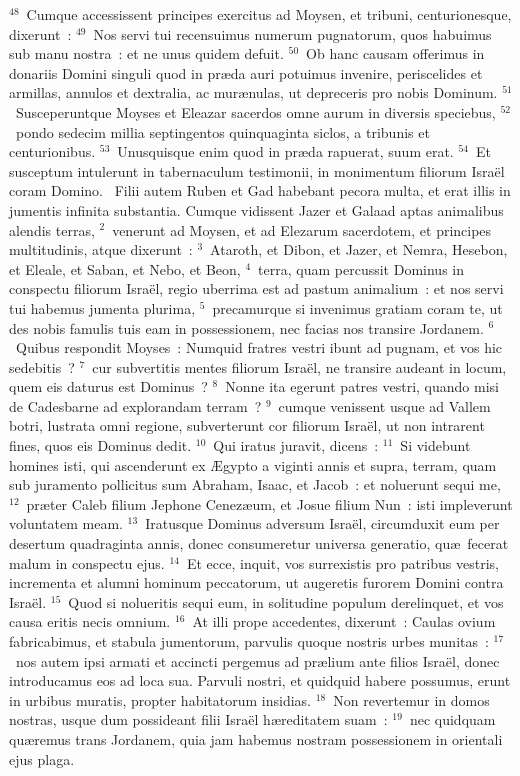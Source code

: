 ${}^{48}$~Cumque accessissent principes exercitus ad Moysen, et tribuni, centurionesque, dixerunt~:
${}^{49}$~Nos servi tui recensuimus numerum pugnatorum, quos habuimus sub manu nostra~: et ne unus quidem defuit.
${}^{50}$~Ob hanc causam offerimus in donariis Domini singuli quod in pr\ae da auri potuimus invenire, periscelides et armillas, annulos et dextralia, ac mur\ae nulas, ut depreceris pro nobis Dominum.
${}^{51}$~Susceperuntque Moyses et Eleazar sacerdos omne aurum in diversis speciebus,
${}^{52}$~pondo sedecim millia septingentos quinquaginta siclos, a tribunis et centurionibus.
${}^{53}$~Unusquisque enim quod in pr\ae da rapuerat, suum erat.
${}^{54}$~Et susceptum intulerunt in tabernaculum testimonii, in monimentum filiorum Isra\"el coram Domino.
~\lettrine[lines=10,image=true,loversize=0.05,lraise=-0.03]{F}{}ilii autem Ruben et Gad habebant pecora multa, et erat illis in jumentis infinita substantia. Cumque vidissent Jazer et Galaad aptas animalibus alendis terras,
${}^{2}$~venerunt ad Moysen, et ad Elezarum sacerdotem, et principes multitudinis, atque dixerunt~:
${}^{3}$~Ataroth, et Dibon, et Jazer, et Nemra, Hesebon, et Eleale, et Saban, et Nebo, et Beon,
${}^{4}$~terra, quam percussit Dominus in conspectu filiorum Isra\"el, regio uberrima est ad pastum animalium~: et nos servi tui habemus jumenta plurima,
${}^{5}$~precamurque si invenimus gratiam coram te, ut des nobis famulis tuis eam in possessionem, nec facias nos transire Jordanem.
${}^{6}$~Quibus respondit Moyses~: Numquid fratres vestri ibunt ad pugnam, et vos hic sedebitis~?
${}^{7}$~cur subvertitis mentes filiorum Isra\"el, ne transire audeant in locum, quem eis daturus est Dominus~?
${}^{8}$~Nonne ita egerunt patres vestri, quando misi de Cadesbarne ad explorandam terram~?
${}^{9}$~cumque venissent usque ad Vallem botri, lustrata omni regione, subverterunt cor filiorum Isra\"el, ut non intrarent fines, quos eis Dominus dedit.
${}^{10}$~Qui iratus juravit, dicens~:
${}^{11}$~Si videbunt homines isti, qui ascenderunt ex \AE gypto a viginti annis et supra, terram, quam sub juramento pollicitus sum Abraham, Isaac, et Jacob~: et noluerunt sequi me,
${}^{12}$~pr\ae ter Caleb filium Jephone Cenez\ae um, et Josue filium Nun~: isti impleverunt voluntatem meam.
${}^{13}$~Iratusque Dominus adversum Isra\"el, circumduxit eum per desertum quadraginta annis, donec consumeretur universa generatio, qu\ae\ fecerat malum in conspectu ejus.
${}^{14}$~Et ecce, inquit, vos surrexistis pro patribus vestris, incrementa et alumni hominum peccatorum, ut augeretis furorem Domini contra Isra\"el.
${}^{15}$~Quod si nolueritis sequi eum, in solitudine populum derelinquet, et vos causa eritis necis omnium.
${}^{16}$~At illi prope accedentes, dixerunt~: Caulas ovium fabricabimus, et stabula jumentorum, parvulis quoque nostris urbes munitas~:
${}^{17}$~nos autem ipsi armati et accincti pergemus ad pr\ae lium ante filios Isra\"el, donec introducamus eos ad loca sua. Parvuli nostri, et quidquid habere possumus, erunt in urbibus muratis, propter habitatorum insidias.
${}^{18}$~Non revertemur in domos nostras, usque dum possideant filii Isra\"el h\ae reditatem suam~:
${}^{19}$~nec quidquam qu\ae remus trans Jordanem, quia jam habemus nostram possessionem in orientali ejus plaga.


